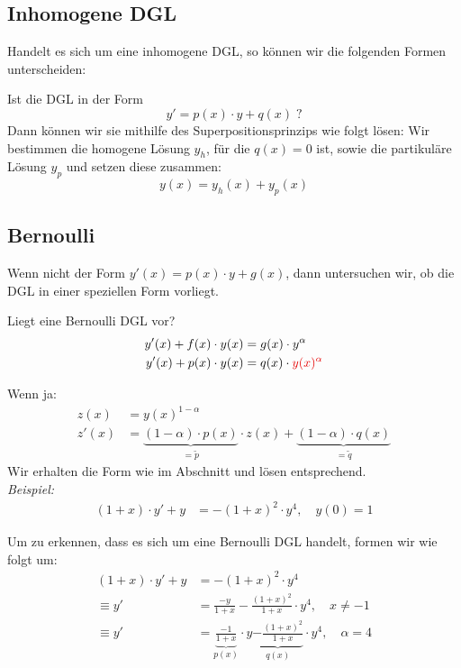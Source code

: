 \documentclass[main.tex]{subfiles}
\begin{document}
\subsection{Inhomogene DGL} \label{inhomogen}
Handelt es sich um eine inhomogene DGL, so können wir die folgenden Formen unterscheiden: 

Ist die DGL in der Form
\[
	y' = p(x)\cdot y + q(x)\; ?
\]
Dann können wir sie mithilfe des Superpositionsprinzips wie folgt lösen: 
Wir bestimmen die homogene Lösung $y_h$, für die $q(x)=0$ ist, sowie die partikuläre Lösung $y_p$ und setzen diese zusammen:
\[
	y(x) = y_h(x) + y_p(x)
\]


\subsection{Bernoulli} \label{bernoulli}
Wenn nicht der Form $y'(x) = p(x)\cdot y + g(x)$, dann untersuchen wir, ob die DGL in einer speziellen Form vorliegt.

Liegt eine Bernoulli DGL vor?
\begin{align*}
	y'(x) + f(x)\cdot y(x) &= g(x)\cdot y^\alpha \\
	y'(x) + p(x)\cdot y(x) &= q(x)\cdot \textcolor{red}{y(x)^\alpha}
\end{align*}

Wenn ja: 
\begin{align*}
	z(x)  &= y(x)^{1-\alpha} \\
	z'(x) &= \underbrace{(1-\alpha)\cdot p(x)}_{= \tilde{p}}\cdot z(x) + \underbrace{(1-\alpha)\cdot q(x)}_{= \tilde{q}}	
\end{align*}
Wir erhalten die Form wie im Abschnitt  und lösen entsprechend.\\

\textit{Beispiel:}
\begin{align*}
	(1+x)\cdot y' + y &= - (1+x)^2\cdot y^4, \quad y(0) = 1
\end{align*}

Um zu erkennen, dass es sich um eine Bernoulli DGL handelt, formen wir wie folgt um: 
\begin{align*}
	(1+x)\cdot y' + y &= - (1+x)^2\cdot y^4 \\
\equiv	y' &= \frac{-y}{1+x} - \frac{(1+x)^2}{1+x} \cdot y^4, \quad x\neq -1 \\
\equiv	y' &= \underbrace{\frac{-1}{1+x}}_{p(x)} \cdot y \underbrace{- \frac{(1+x)^2}{1+x}}_{q(x)} \cdot y^4, \quad \alpha = 4
\end{align*}
\end{document}
